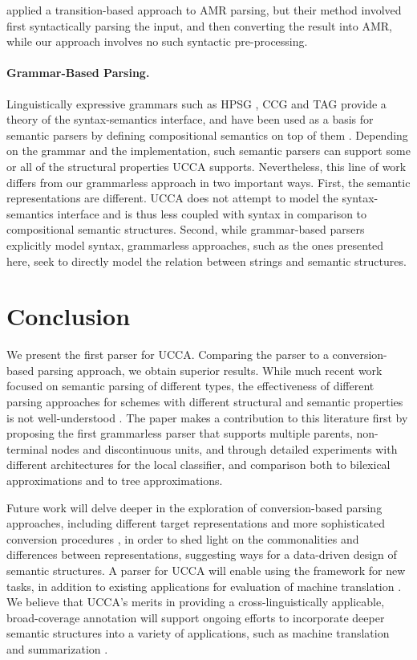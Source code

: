 \documentclass[11pt]{article}
\begin{document}
 applied a transition-based approach to AMR parsing,
but their method involved first syntactically parsing the input, and then converting
the result into AMR, while our approach involves no such syntactic pre-processing.

\paragraph{Grammar-Based Parsing.}
Linguistically expressive grammars such as HPSG \cite{PandS:94}, CCG \cite{Steedman:00} and TAG \cite{Joshi:97}
provide a theory of the syntax-semantics interface, and have been used as a basis for semantic parsers
by defining compositional semantics on top of them \cite[among others]{Flic:00,bos2005towards}.
Depending on the grammar and the implementation, such semantic parsers can support
some or all of the structural properties UCCA supports.
Nevertheless, this line of work differs from our grammarless approach in two important ways.
First, the semantic representations are different. UCCA does not attempt to model
the syntax-semantics interface and is thus less coupled with syntax in comparison to
compositional semantic structures.
Second, while grammar-based parsers explicitly model syntax, grammarless
approaches, such as the ones presented here, seek to directly model the relation between
strings and semantic structures.


\section{Conclusion}\label{sec:conclusion}
We present the first parser for UCCA.
Comparing the parser to a conversion-based parsing approach, we obtain
superior results.
While much recent work focused on semantic parsing of different types,
the effectiveness of different parsing approaches for schemes with
different structural and semantic properties is not well-understood 
\cite{kuhlmann2016towards}.
The paper makes a contribution to this literature first by proposing the first grammarless parser that supports multiple parents, non-terminal nodes and discontinuous units, and through detailed experiments with different architectures for the local classifier, and comparison both to bilexical approximations and to tree approximations.

Future work will delve deeper in the exploration of
conversion-based parsing approaches, including different target
representations and more sophisticated conversion procedures \cite{kong-15},
in order to shed light on the commonalities and differences between
representations, suggesting ways for a data-driven design of semantic structures.
A parser for UCCA will enable using the framework for new tasks,
in addition to existing applications for evaluation of
machine translation \cite{birch2016hume}.
We believe that UCCA's merits in providing a cross-linguistically applicable,
broad-coverage annotation will support ongoing efforts to incorporate deeper
semantic structures into a variety of applications,
such as machine translation \cite{jones2012semantics}
and summarization \cite{liu2015toward}.




\end{document}
